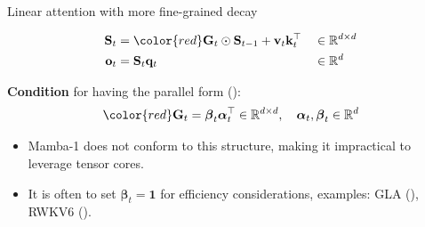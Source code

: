 \begin{frame}{Linear attention with more fine-grained decay}

    \begin{align*}
        \mathbf{S}_t &= {\color{red}\mathbf{G}_t} \odot \mathbf{S}_{t-1} + \mathbf{v}_t\mathbf{k}_t^\top &&\in \mathbb{R}^{d \times d}  \\
        \mathbf{o}_t &= \mathbf{S}_t\mathbf{q}_t &&\in \mathbb{R}^d  
    \end{align*}

    \textbf{Condition} for having the parallel form (\cite{gla}):
    \[{\color{red}\mathbf{G}_t = \boldsymbol{\beta}_t\boldsymbol{\alpha}_t^\top \in \mathbb{R}^{d\times d}, \quad \boldsymbol{\alpha}_t, \boldsymbol{\beta}_t \in \mathbb{R}^d}
    \]


    \begin{itemize}
        \item Mamba-1 does not conform to this structure, making it impractical to leverage tensor cores.
        \item It is often to set $\boldsymbol{\beta}_t = \mathbf{1}$ for efficiency considerations, examples: GLA (\cite{gla}), RWKV6 (\cite{rwkv6}).
    \end{itemize}

\end{frame}

